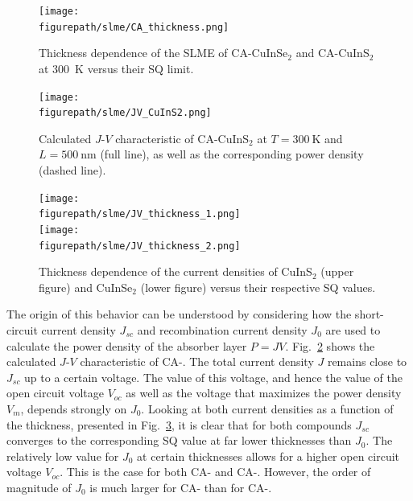 \begin{refsection}
\begin{figure}[ht] 
\centering 
\captionsetup{width=0.9\textwidth}
\texttt{[image: \\figurepath/slme/CA\_thickness.png]} 
\caption{Thickness dependence of the SLME of CA-CuInSe$_2$ and CA-CuInS$_2$ 
at 300~\si{\kelvin} versus their SQ limit.} 
\label{slme:fig-SLME_L} 
\end{figure} 
 
\begin{figure}[ht] 
\centering 
\captionsetup{width=0.9\textwidth}
\texttt{[image: \\figurepath/slme/JV\_CuInS2.png]} 
\caption{Calculated $J$-$V$ characteristic of CA-CuInS$_2$ at 
$T=300~\si{\kelvin}$ and $L = 500~\si{\nano\meter}$ (full line), as well as 
the corresponding power density (dashed line).} 
\label{slme:fig-CuInS2_JV} 
\end{figure}

\begin{figure}[!ht] 
\centering 
\captionsetup{width=0.9\textwidth}
\texttt{[image: \\figurepath/slme/JV\_thickness\_1.png]} \\\vspace{-0.5em}
\texttt{[image: \\figurepath/slme/JV\_thickness\_2.png]}	 
\caption{Thickness dependence of the current densities of CuInS$_2$ (upper 
figure) and CuInSe$_2$ (lower figure) versus their respective SQ values.} 
\label{slme:fig-J_L} 
\end{figure} 

The origin of this behavior can be understood by considering how the 
short-circuit current density $J_{sc}$ and recombination current density 
$J_0$ are used to calculate the power density of the absorber layer $P = JV$. 
Fig.~\ref{slme:fig-CuInS2_JV} shows the calculated \mbox{$J$-$V$} 
characteristic of \mbox{CA-}. The total current 
density $J$ remains close to $J_{sc}$ up to a certain voltage. The value of 
this voltage, and hence the value of the open circuit voltage $V_{oc}$ as well as the 
voltage that maximizes the power density $V_{m}$, depends strongly on $J_0$. 
Looking at both current densities as a function of the thickness, presented in 
Fig.~\ref{slme:fig-J_L}, it is clear that for both compounds $J_{sc}$ 
converges to the corresponding SQ value at far lower thicknesses than $J_0$. The 
relatively low value for $J_0$ at certain thicknesses allows for a higher open 
circuit voltage $V_{oc}$. This is the case for both \mbox{CA-} and 
\mbox{CA-}. However, the order of magnitude of $J_0$ is much 
larger for CA- than for \mbox{CA-}. 


\end{refsection}
